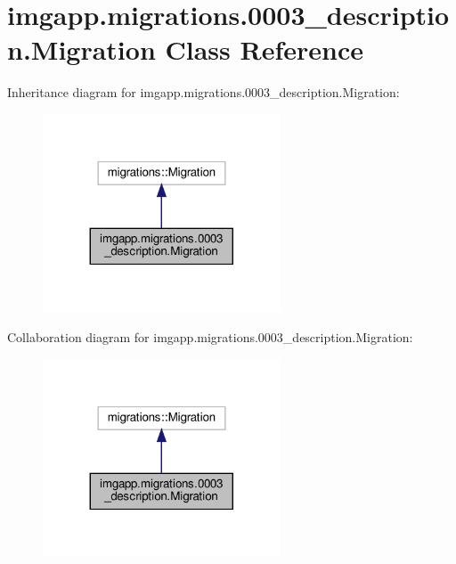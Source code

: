 \hypertarget{classimgapp_1_1migrations_1_10003__description_1_1Migration}{}\section{imgapp.\+migrations.0003\+\_\+description.Migration Class Reference}
\label{classimgapp_1_1migrations_1_10003__description_1_1Migration}


Inheritance diagram for imgapp.\+migrations.0003\+\_\+description.Migration\+:
\nopagebreak
\begin{figure}[H]
\begin{center}
\leavevmode
\includegraphics[width=200pt]{classimgapp_1_1migrations_1_10003__description_1_1Migration__inherit__graph}
\end{center}
\end{figure}


Collaboration diagram for imgapp.\+migrations.0003\+\_\+description.Migration\+:
\nopagebreak
\begin{figure}[H]
\begin{center}
\leavevmode
\includegraphics[width=200pt]{classimgapp_1_1migrations_1_10003__description_1_1Migration__coll__graph}
\end{center}
\end{figure}
